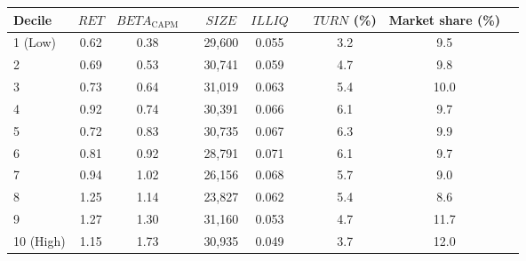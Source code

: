 \begin{tabular}{@{}lccccccccc@{}}
	\toprule
	Decile & $\textit{RET}$ & $\textit{BETA}_\textrm{CAPM}$ && $\textit{SIZE}$ & $\textit{ILLIQ}$ && $\textit{TURN}$ (\%) & Market share (\%) \\ \midrule
1 (Low) & 0.62 & 0.38 && 29,600 & 0.055 && 3.2 & 9.5 \\
2       & 0.69 & 0.53 && 30,741 & 0.059 && 4.7 & 9.8 \\
3       & 0.73 & 0.64 && 31,019 & 0.063 && 5.4 & 10.0 \\
4       & 0.92 & 0.74 && 30,391 & 0.066 && 6.1 & 9.7 \\
5       & 0.72 & 0.83 && 30,735 & 0.067 && 6.3 & 9.9 \\
6       & 0.81 & 0.92 && 28,791 & 0.071 && 6.1 & 9.7 \\
7       & 0.94 & 1.02 && 26,156 & 0.068 && 5.7 & 9.0 \\
8       & 1.25 & 1.14 && 23,827 & 0.062 && 5.4 & 8.6 \\
9       & 1.27 & 1.30 && 31,160 & 0.053 && 4.7 & 11.7 \\
10 (High) & 1.15 & 1.73 && 30,935 & 0.049 && 3.7 & 12.0 \\
	\bottomrule
\end{tabular}